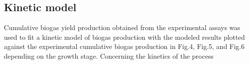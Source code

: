 \subsection{Kinetic model}
Cumulative biogas yield production obtained from the experimental assays was used to fit a kinetic model of biogas production with the modeled results plotted against the experimental cumulative biogas production in Fig.4, Fig.5, and Fig.6 depending on the growth stage.
Concerning the kinetics of the process